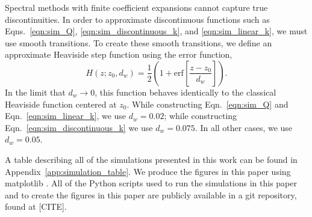 \documentclass[twocolumn]{aastex631}
\begin{document}
Spectral methods with finite coefficient expansions cannot capture true discontinuities.
In order to approximate discontinuous functions such as Eqns.~\ref{eqn:sim_Q}, \ref{eqn:sim_discontinuous_k}, and \ref{eqn:sim_linear_k}, we must use smooth transitions.
To create these smooth transitions, we define an approximate Heaviside step function using the error function,
\begin{equation}
H(z; z_0, d_w) = \frac{1}{2}\left(1 + \mathrm{erf}\left[\frac{z - z_0}{d_w}\right]\right).
\label{eqn:heaviside}
\end{equation}
In the limit that $d_w \rightarrow 0$, this function behaves identically to the classical Heaviside function centered at $z_0$.
While constructing Eqn.~\ref{eqn:sim_Q} and Eqn.~\ref{eqn:sim_linear_k}, we use $d_w = 0.02$; while constructing Eqn.~\ref{eqn:sim_discontinuous_k} we use $d_w = 0.075$.
In all other cases, we use $d_w = 0.05$.

A table describing all of the simulations presented in this work can be found in Appendix~\ref{app:simulation_table}.
We produce the figures in this paper using matplotlib \citep{hunter2007, mpl3.3.4}.
All of the Python scripts used to run the simulations in this paper and to create the figures in this paper are publicly available in a git repository, found at [CITE].
\end{document}
